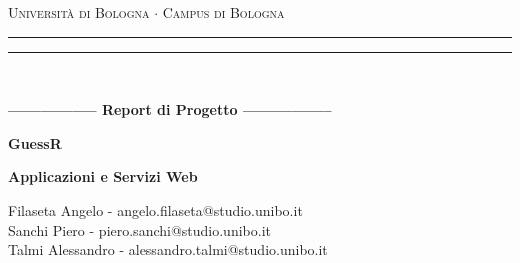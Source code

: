 \begin{titlepage}
    \begin{center}
        {{\Large{\textsc{Università di Bologna $\cdot$ Campus di Bologna}}}}
        \rule[0.1cm]{15.8cm}{0.1mm}
        \rule[0.5cm]{15.8cm}{0.6mm}
        \\
        \vspace{3mm}
    \end{center}
    \vspace{2mm}
    \begin{center}
        {\LARGE{\bf{----------------- Report di Progetto -----------------}}}
        \vspace{5mm} \par \noindent
        {\Huge{\bf{GuessR}}}
        \vspace{10mm} \par \noindent
        {\LARGE \textbf{Applicazioni e Servizi Web}}
        \vspace{15mm} \par \noindent
        {\Large Filaseta Angelo - angelo.filaseta@studio.unibo.it \\
        	Sanchi Piero - piero.sanchi@studio.unibo.it \\
        	Talmi Alessandro - alessandro.talmi@studio.unibo.it}
    \end{center}
    \hfill
    \vspace{40mm}
\end{titlepage}

